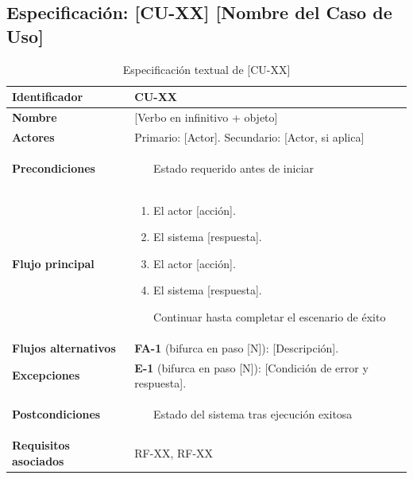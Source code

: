 \documentclass[journal,onecolumn]{IEEEtran}
\begin{document}
\subsection{Especificación: [CU-XX] [Nombre del Caso de Uso]}

\begin{table}[H]
\caption{Especificación textual de [CU-XX]}
\label{tab:cu02}
\begin{tabularx}{\textwidth}{|l|X|}
\hline
\textbf{Identificador}       & CU-XX \\
\hline
\textbf{Nombre}              & [Verbo en infinitivo + objeto] \\
\hline
\textbf{Actores}             & Primario: [Actor]. Secundario: [Actor, si aplica] \\
\hline
\textbf{Precondiciones}      & \begin{enumerate}[leftmargin=*,topsep=0pt]
                                 \item [Estado requerido antes de iniciar]
                               \end{enumerate} \\
\hline
\textbf{Flujo principal}     & \begin{enumerate}[leftmargin=*,topsep=0pt]
                                 \item El actor [acción].
                                 \item El sistema [respuesta].
                                 \item El actor [acción].
                                 \item El sistema [respuesta].
                                 \item [Continuar hasta completar el escenario de éxito]
                               \end{enumerate} \\
\hline
\textbf{Flujos alternativos} & \textbf{FA-1} (bifurca en paso [N]): [Descripción]. \\
\hline
\textbf{Excepciones}         & \textbf{E-1} (bifurca en paso [N]): [Condición de error y respuesta]. \\
\hline
\textbf{Postcondiciones}     & \begin{enumerate}[leftmargin=*,topsep=0pt]
                                 \item [Estado del sistema tras ejecución exitosa]
                               \end{enumerate} \\
\hline
\textbf{Requisitos asociados} & RF-XX, RF-XX \\
\hline
\end{tabularx}
\end{table}
\end{document}
